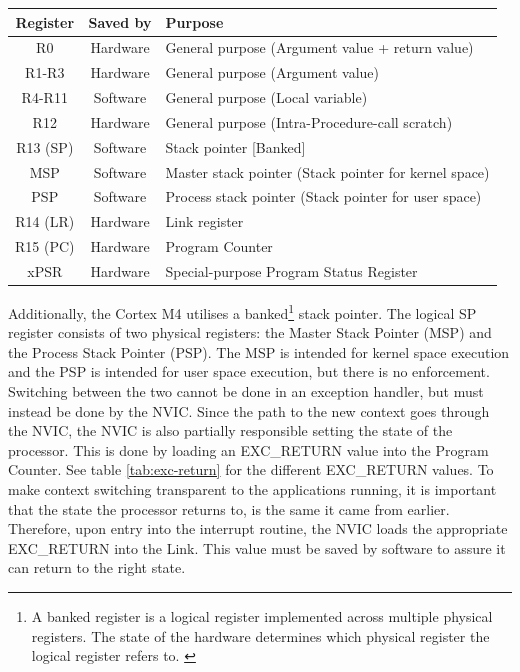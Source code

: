 \begin{table}[H]
	\centering
	\begin{tabular}{|c|c|p{9.5cm}|}
		\hline
		Register	&	Saved by	&	Purpose\\
		\hline
		R0			&	Hardware	&	General purpose (Argument value + return value)\\
		\hline
		R1-R3		&	Hardware	&	General purpose (Argument value)\\
		\hline
		R4-R11		&	Software	&	General purpose (Local variable)\\
		\hline
		R12			&	Hardware	&	General purpose (Intra-Procedure-call scratch)\\
		\hline
		R13 (SP)	&	Software	&	Stack pointer [Banked]\\
		MSP			&	Software	&	Master stack pointer (Stack pointer for kernel space)\\
		PSP			&	Software	&	Process stack pointer (Stack pointer for user space)\\
		\hline
		R14 (LR)	&	Hardware	&	Link register\\
		\hline
		R15 (PC)	&	Hardware	&	Program Counter\\
		\hline
		xPSR		&	Hardware	& 	Special-purpose Program Status Register\\
		\hline
	\end{tabular}
	\label{tab:registers}
\end{table}

Additionally, the Cortex M4 utilises a banked\footnote{A banked register is a
logical register implemented across multiple physical registers. The state of 
the hardware determines which physical register the logical register refers to.
\cite{register_banking}} stack pointer.
The logical SP register consists of two physical registers: the Master Stack 
Pointer (MSP) and the Process Stack Pointer (PSP).
The MSP is intended for kernel space execution and the PSP is intended for user space execution, but there is no enforcement.
Switching between the two cannot be done in an exception handler, but must instead be done by the NVIC.
Since the path to the new context goes through the NVIC, the NVIC is also partially responsible setting the state of the processor.
This is done by loading an EXC\_RETURN value into the Program Counter. See table \ref{tab:exc-return} for the different EXC\_RETURN values.
To make context switching transparent to the applications running, it is important that the state the processor returns to, is the
same it came from earlier. Therefore, upon entry into the interrupt routine, the NVIC loads the appropriate EXC\_RETURN into the Link.
This value must be saved by software to assure it can return to the right state.

